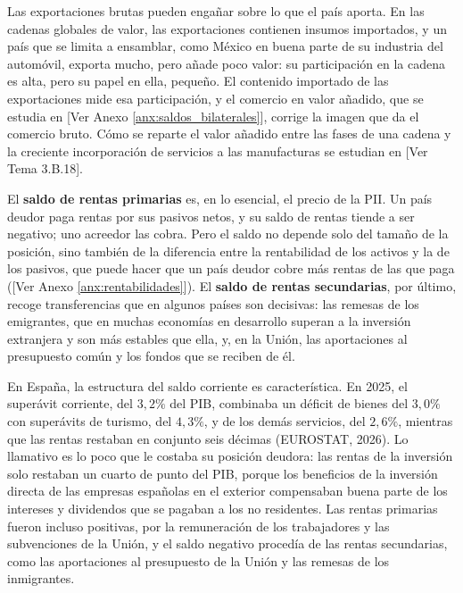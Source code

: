 \documentclass[10pt,a4paper]{article}
\newcommand{\authorfont}[1]{{\fontfamily{EBGaramond-TLF}\selectfont #1}}
\begin{document}
Las exportaciones brutas pueden engañar sobre lo que el país aporta. En las cadenas globales de valor, las exportaciones contienen insumos importados, y un país que se limita a ensamblar, como México en buena parte de su industria del automóvil, exporta mucho, pero añade poco valor: su participación en la cadena es alta, pero su papel en ella, pequeño. El contenido importado de las exportaciones mide esa participación, y el comercio en valor añadido, que se estudia en [\authorfont{Ver Anexo \ref{anx:saldos_bilaterales}}], corrige la imagen que da el comercio bruto. Cómo se reparte el valor añadido entre las fases de una cadena y la creciente incorporación de servicios a las manufacturas se estudian en [\authorfont{Ver Tema 3.B.18}].

El \textbf{saldo de rentas primarias} es, en lo esencial, el precio de la PII. Un país deudor paga rentas por sus pasivos netos, y su saldo de rentas tiende a ser negativo; uno acreedor las cobra. Pero el saldo no depende solo del tamaño de la posición, sino también de la diferencia entre la rentabilidad de los activos y la de los pasivos, que puede hacer que un país deudor cobre más rentas de las que paga ([\authorfont{Ver Anexo \ref{anx:rentabilidades}}]). El \textbf{saldo de rentas secundarias}, por último, recoge transferencias que en algunos países son decisivas: las remesas de los emigrantes, que en muchas economías en desarrollo superan a la inversión extranjera y son más estables que ella, y, en la Unión, las aportaciones al presupuesto común y los fondos que se reciben de él.

En España, la estructura del saldo corriente es característica. En 2025, el superávit corriente, del $3{,}2\%$ del PIB, combinaba un déficit de bienes del $3{,}0\%$ con superávits de turismo, del $4{,}3\%$, y de los demás servicios, del $2{,}6\%$, mientras que las rentas restaban en conjunto seis décimas (EUROSTAT, 2026). Lo llamativo es lo poco que le costaba su posición deudora: las rentas de la inversión solo restaban un cuarto de punto del PIB, porque los beneficios de la inversión directa de las empresas españolas en el exterior compensaban buena parte de los intereses y dividendos que se pagaban a los no residentes. Las rentas primarias fueron incluso positivas, por la remuneración de los trabajadores y las subvenciones de la Unión, y el saldo negativo procedía de las rentas secundarias, como las aportaciones al presupuesto de la Unión y las remesas de los inmigrantes.
\end{document}
